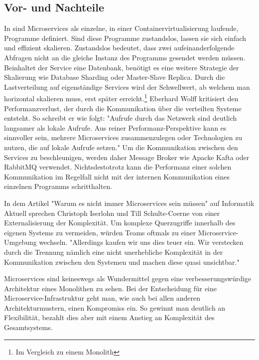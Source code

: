 \subsection{Vor- und Nachteile}
\label{subsec:vorundnachteile}
In  sind Microservices
als einzelne, in einer Containervirtualisierung laufende, Programme definiert. Sind diese Programme
zustandslos, lassen sie sich einfach und effizient skalieren. Zustandslos bedeutet, dass zwei
aufeinanderfolgende Abfragen nicht an die gleiche Instanz des Programms gesendet werden müssen.
Beinhaltet der Service eine Datenbank, benötigt es eine weitere Strategie der Skalierung
wie Database Sharding oder Master-Slave Replica. Durch die Lastverteilung auf eigenständige Services
wird der Schwellwert, ab welchem man horizontal skalieren muss, erst später erreicht.\footnote{Im Vergleich zu einem Monolith}
Eberhard Wolff kritisiert den Performanzverlust, der durch die
Kommunikation über die verteilten Systeme entsteht. So schreibt er wie folgt: "Aufrufe durch das Netzwerk
sind deutlich langsamer als lokale Aufrufe. Aus reiner Performanz-Perspektive kann es sinnvoller sein,
mehrere Microservices zusammenzulegen oder Technologien zu nutzen, die auf lokale Aufrufe setzen."\cite[S. 65, 3. Absatz]{MicroservicesBook}
Um die Kommunikation zwischen den Services zu beschleunigen, werden daher Message Broker wie
Apacke Kafta oder RabbitMQ verwendet. Nichtsdestotrotz kann die Performanz einer solchen
Kommunikation im Regelfall nicht mit der internen Kommunikation eines einzelnen Programms schritthalten.

In dem Artikel "Warum es nicht immer Microservices sein müssen" auf Informatik Aktuell
sprechen Christoph Iserlohn und Till Schulte-Coerne von einer Externalisierung der Komplexität.
Um komplexe Querzugriffe innerhalb des eigenen Systems zu vermeiden, würden Teams oftmals 
zu einer Microservice-Umgebung wechseln. "Allerdings kaufen wir uns dies teuer ein.
Wir verstecken durch die Trennung nämlich eine nicht unerhebliche Komplexität in
der Kommunikation zwischen den Systemen und machen diese quasi unsichtbar."\cite[Paragraph 11]{InformatikAktuellWarumNichtImmerMicroservices}

Microservices sind keineswegs als Wundermittel gegen eine verbesserungswürdige Architektur eines
Monolithen zu sehen. Bei der Entscheidung für eine Microservice-Infrastruktur geht man, wie
auch bei allen anderen Architekturmustern, einen Kompromiss ein. So gewinnt man deutlich
an Flexibilität, bezahlt dies aber mit einem Anstieg an Komplexität des Gesamtsystems.
